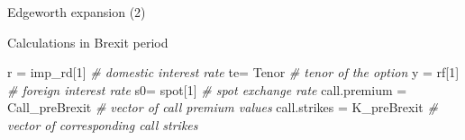 \documentclass[ignorenonframetext,aspectratio=169]{beamer}
\newenvironment{Shaded}{}{}
\newcommand{\DecValTok}[1]{\textcolor[rgb]{0.25,0.63,0.44}{#1}}
\newcommand{\StringTok}[1]{\textcolor[rgb]{0.25,0.44,0.63}{#1}}
\newcommand{\CommentTok}[1]{\textcolor[rgb]{0.38,0.63,0.69}{\textit{#1}}}
\newcommand{\NormalTok}[1]{#1}
\begin{document}
\begin{frame}[fragile]{Edgeworth expansion (2)}

Calculations in Brexit period

\begin{Shaded}
\begin{Highlighting}[]
\NormalTok{r =}\StringTok{ }\NormalTok{imp_rd[}\DecValTok{1}\NormalTok{]                      }\CommentTok{# domestic interest rate}
\NormalTok{te=}\StringTok{ }\NormalTok{Tenor                          }\CommentTok{# tenor of the option}
\NormalTok{y =}\StringTok{ }\NormalTok{rf[}\DecValTok{1}\NormalTok{]                          }\CommentTok{# foreign interest rate}
\NormalTok{s0=}\StringTok{ }\NormalTok{spot[}\DecValTok{1}\NormalTok{]                        }\CommentTok{# spot exchange rate}
\NormalTok{call.premium =}\StringTok{ }\NormalTok{Call_preBrexit      }\CommentTok{# vector of call premium values}
\NormalTok{call.strikes =}\StringTok{ }\NormalTok{K_preBrexit         }\CommentTok{# vector of corresponding call strikes}
\end{Highlighting}
\end{Shaded}

\end{frame}
\end{document}
